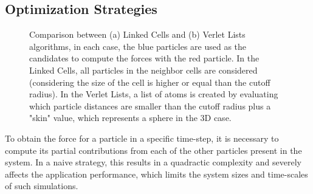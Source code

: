 \documentclass[preprint,12pt]{elsarticle}
\begin{document}
\subsection{Optimization Strategies}
\label{sec:opts}

\begin{figure}[htb]
    \centering
    \caption{Comparison between (a) Linked Cells and (b) Verlet Lists algorithms, in each case, the blue particles are used as the candidates to compute the forces with the red particle. In the Linked Cells, all particles in the neighbor cells are considered (considering the size of the cell is higher or equal than the cutoff radius). In the Verlet Lists, a list of atoms is created by evaluating which particle distances are smaller than the cutoff radius plus a "skin" value, which represents a sphere in the 3D case.}
\end{figure}

To obtain the force for a particle in a specific time-step, it is necessary to compute its partial contributions from each of the other particles present in the system.
In a naive strategy, this results in a quadractic complexity and severely affects the application performance, which limits the system sizes and time-scales of such simulations.
\end{document}
